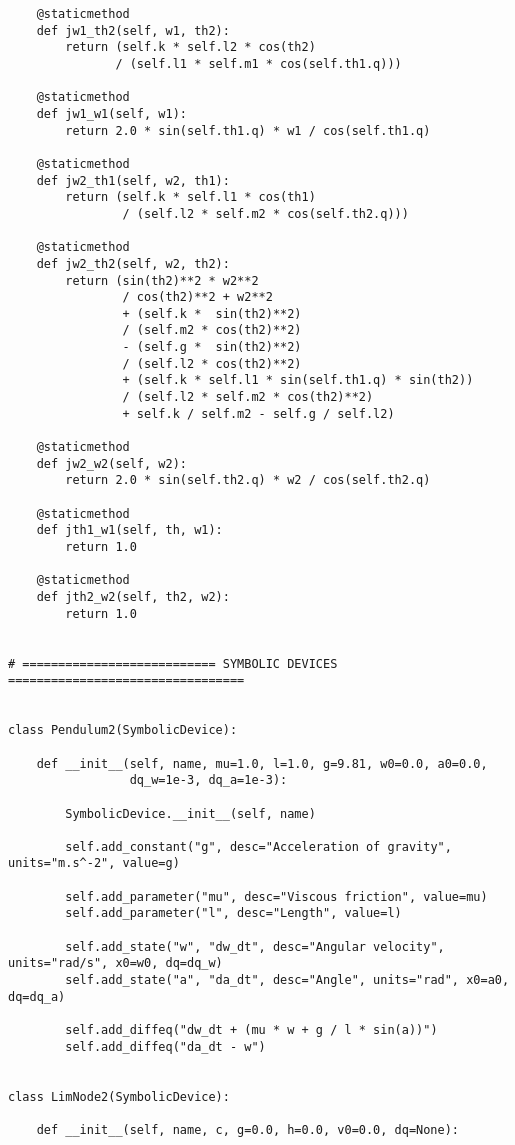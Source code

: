 \begin{lstlisting}
    @staticmethod
    def jw1_th2(self, w1, th2):
        return (self.k * self.l2 * cos(th2)
               / (self.l1 * self.m1 * cos(self.th1.q)))

    @staticmethod
    def jw1_w1(self, w1):
        return 2.0 * sin(self.th1.q) * w1 / cos(self.th1.q)

    @staticmethod
    def jw2_th1(self, w2, th1):
        return (self.k * self.l1 * cos(th1)
                / (self.l2 * self.m2 * cos(self.th2.q)))

    @staticmethod
    def jw2_th2(self, w2, th2):
        return (sin(th2)**2 * w2**2
                / cos(th2)**2 + w2**2
                + (self.k *  sin(th2)**2)
                / (self.m2 * cos(th2)**2)
                - (self.g *  sin(th2)**2)
                / (self.l2 * cos(th2)**2)
                + (self.k * self.l1 * sin(self.th1.q) * sin(th2))
                / (self.l2 * self.m2 * cos(th2)**2)
                + self.k / self.m2 - self.g / self.l2)

    @staticmethod
    def jw2_w2(self, w2):
        return 2.0 * sin(self.th2.q) * w2 / cos(self.th2.q)

    @staticmethod
    def jth1_w1(self, th, w1):
        return 1.0

    @staticmethod
    def jth2_w2(self, th2, w2):
        return 1.0


# =========================== SYMBOLIC DEVICES =================================


class Pendulum2(SymbolicDevice):

    def __init__(self, name, mu=1.0, l=1.0, g=9.81, w0=0.0, a0=0.0,
                 dq_w=1e-3, dq_a=1e-3):

        SymbolicDevice.__init__(self, name)

        self.add_constant("g", desc="Acceleration of gravity", units="m.s^-2", value=g)

        self.add_parameter("mu", desc="Viscous friction", value=mu)
        self.add_parameter("l", desc="Length", value=l)

        self.add_state("w", "dw_dt", desc="Angular velocity", units="rad/s", x0=w0, dq=dq_w)
        self.add_state("a", "da_dt", desc="Angle", units="rad", x0=a0, dq=dq_a)

        self.add_diffeq("dw_dt + (mu * w + g / l * sin(a))")
        self.add_diffeq("da_dt - w")


class LimNode2(SymbolicDevice):

    def __init__(self, name, c, g=0.0, h=0.0, v0=0.0, dq=None):


\end{lstlisting}
